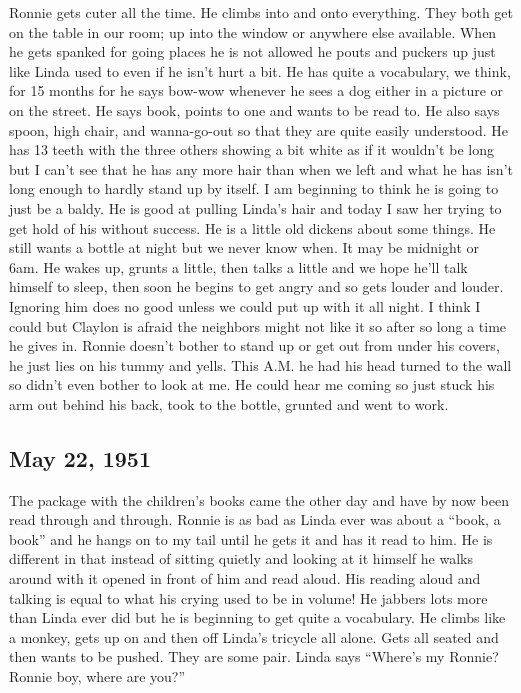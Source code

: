 \documentclass[
]{book}
\begin{document}
Ronnie gets cuter all the time. He climbs into and onto everything. They both get on the table in our room; up into the window or anywhere else available. When he gets spanked for going places he is not allowed he pouts and puckers up just like Linda used to even if he isn't hurt a bit. He has quite a vocabulary, we think, for 15 months for he says bow-wow whenever he sees a dog either in a picture or on the street. He says book, points to one and wants to be read to. He also says spoon, high chair, and wanna-go-out so that they are quite easily understood. He has 13 teeth with the three others showing a bit white as if it wouldn't be long but I can't see that he has any more hair than when we left and what he has isn't long enough to hardly stand up by itself. I am beginning to think he is going to just be a baldy. He is good at pulling Linda's hair and today I saw her trying to get hold of his without success. He is a little old dickens about some things. He still wants a bottle at night but we never know when. It may be midnight or 6am. He wakes up, grunts a little, then talks a little and we hope he'll talk himself to sleep, then soon he begins to get angry and so gets louder and louder. Ignoring him does no good unless we could put up with it all night. I think I could but Claylon is afraid the neighbors might not like it so after so long a time he gives in. Ronnie doesn't bother to stand up or get out from under his covers, he just lies on his tummy and yells. This A.M. he had his head turned to the wall so didn't even bother to look at me. He could hear me coming so just stuck his arm out behind his back, took to the bottle, grunted and went to work.

\hypertarget{may-22-1951}{%
\subsection{May 22, 1951}\label{may-22-1951}}

The package with the children's books came the other day and have by now been read through and through. Ronnie is as bad as Linda ever was about a ``book, a book'' and he hangs on to my tail until he gets it and has it read to him. He is different in that instead of sitting quietly and looking at it himself he walks around with it opened in front of him and read aloud. His reading aloud and talking is equal to what his crying used to be in volume! He jabbers lots more than Linda ever did but he is beginning to get quite a vocabulary. He climbs like a monkey, gets up on and then off Linda's tricycle all alone. Gets all seated and then wants to be pushed. They are some pair. Linda says ``Where's my Ronnie? Ronnie boy, where are you?''
\end{document}
